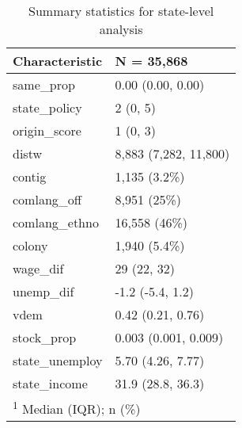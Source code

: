 \documentclass[
  11pt,
]{article}
\begin{document}
\begin{table}

\caption{\label{tab:desc-table-state}Summary statistics for state-level analysis}
\centering
\fontsize{8}{10}\selectfont
\begin{tabular}[t]{ll}
\toprule
Characteristic & N = 35,868\\
\midrule
same\_prop & 0.00 (0.00, 0.00)\\
state\_policy & 2 (0, 5)\\
origin\_score & 1 (0, 3)\\
distw & 8,883 (7,282, 11,800)\\
contig & 1,135 (3.2\%)\\
\addlinespace
comlang\_off & 8,951 (25\%)\\
comlang\_ethno & 16,558 (46\%)\\
colony & 1,940 (5.4\%)\\
wage\_dif & 29 (22, 32)\\
unemp\_dif & -1.2 (-5.4, 1.2)\\
\addlinespace
vdem & 0.42 (0.21, 0.76)\\
stock\_prop & 0.003 (0.001, 0.009)\\
state\_unemploy & 5.70 (4.26, 7.77)\\
state\_income & 31.9 (28.8, 36.3)\\
\bottomrule
\multicolumn{2}{l}{\rule{0pt}{1em}\textsuperscript{1} Median (IQR); n (\%)}\\
\end{tabular}
\end{table}
\end{document}
